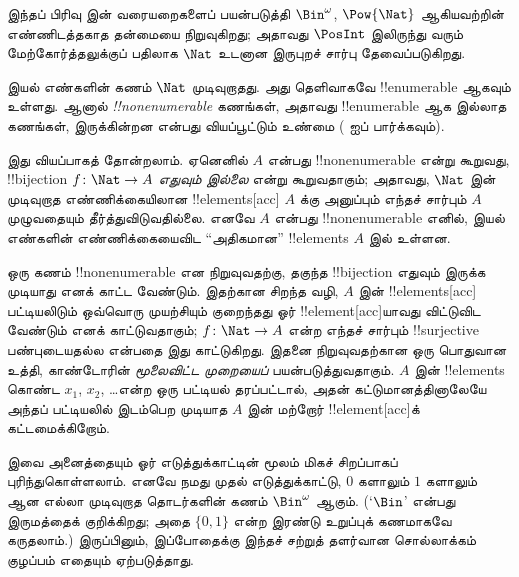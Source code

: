 \documentclass[../../../include/open-logic-section]{subfiles}
\begin{document}


\begin{editorial}
  இந்தப் பிரிவு  இன் வரையறைகளைப் பயன்படுத்தி
  $\Bin^\omega$, $\Pow{\Nat}$ ஆகியவற்றின் எண்ணிடத்தகாத தன்மையை
  நிறுவுகிறது; அதாவது $\PosInt$ இலிருந்து வரும் மேற்கோர்த்தலுக்குப்
  பதிலாக $\Nat$ உடனான இருபுறச் சார்பு தேவைப்படுகிறது.
\end{editorial}

\begin{explain}
இயல் எண்களின் கணம் $\Nat$ முடிவுறாதது.
அது தெளிவாகவே !!{enumerable} ஆகவும் உள்ளது.
ஆனால் \emph{!!{nonenumerable}} கணங்கள், அதாவது !!{enumerable}
ஆக இல்லாத கணங்கள், இருக்கின்றன என்பது வியப்பூட்டும் உண்மை
( ஐப் பார்க்கவும்).

இது வியப்பாகத் தோன்றலாம்.
ஏனெனில் $A$ என்பது !!{nonenumerable} என்று கூறுவது,
!!{bijection} $f \colon \Nat \to A$ \emph{எதுவும் இல்லை} என்று
கூறுவதாகும்; அதாவது, $\Nat$ இன் முடிவுறாத எண்ணிக்கையிலான
!!{element}s[acc] $A$ க்கு அனுப்பும் எந்தச் சார்பும்
$A$ முழுவதையும் தீர்த்துவிடுவதில்லை.
எனவே $A$ என்பது !!{nonenumerable} எனில்,
இயல் எண்களின் எண்ணிக்கையைவிட ``அதிகமான'' !!{element}s
$A$ இல் உள்ளன.

ஒரு கணம் !!{nonenumerable} என நிறுவுவதற்கு,
தகுந்த !!{bijection} எதுவும் இருக்க முடியாது எனக் காட்ட வேண்டும்.
இதற்கான சிறந்த வழி, $A$ இன் !!{element}s[acc] பட்டியலிடும் ஒவ்வொரு
முயற்சியும் குறைந்தது ஓர் !!{element}[acc]யாவது விட்டுவிட வேண்டும்
எனக் காட்டுவதாகும்; $f\colon \Nat \to A$ என்ற எந்தச் சார்பும்
!!{surjective} பண்புடையதல்ல என்பதை இது காட்டுகிறது.
இதனை நிறுவுவதற்கான ஒரு பொதுவான உத்தி,
காண்டோரின் \emph{மூலைவிட்ட முறையைப்} பயன்படுத்துவதாகும்.
$A$ இன் !!{element}s கொண்ட $x_1$, $x_2$, \dots என்ற ஒரு பட்டியல்
தரப்பட்டால், அதன் கட்டுமானத்தினாலேயே அந்தப் பட்டியலில் இடம்பெற
முடியாத $A$ இன் மற்றோர் !!{element}[acc]க் கட்டமைக்கிறோம்.

இவை அனைத்தையும் ஓர் எடுத்துக்காட்டின் மூலம் மிகச் சிறப்பாகப்
புரிந்துகொள்ளலாம்.
எனவே நமது முதல் எடுத்துக்காட்டு, $0$ களாலும் $1$ களாலும் ஆன எல்லா
முடிவுறாத தொடர்களின் கணம் $\Bin^\omega$ ஆகும்.
(`$\Bin$' என்பது இருமத்தைக் குறிக்கிறது; அதை $\{0,1\}$ என்ற
இரண்டு உறுப்புக் கணமாகவே கருதலாம்.)
இருப்பினும், இப்போதைக்கு இந்தச் சற்றுத் தளர்வான சொல்லாக்கம்
குழப்பம் எதையும் ஏற்படுத்தாது.
\end{explain}
\end{document}

